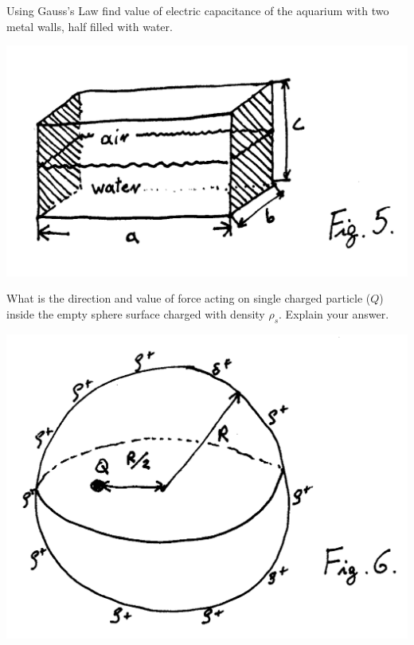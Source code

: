 \begin{Exercise}[difficulty=3]
Using Gauss's Law find value of electric capacitance of the aquarium with two metal walls, half filled with water.
\begin{center}
\includegraphics[scale=0.3]{img/fig_e5.png} 
\end{center}
\end{Exercise}

\begin{Exercise}[difficulty=3]
What is the direction and value of force acting on single charged particle ($Q$) inside the empty sphere surface charged with density $\rho_s$. Explain your answer.
\begin{center}
\includegraphics[scale=0.3]{img/fig_e6.png} 
\end{center}
\end{Exercise}


